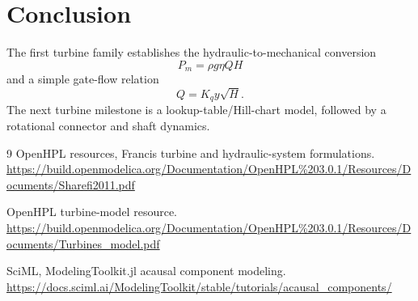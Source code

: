 \documentclass[11pt,a4paper]{article}
\begin{document}
\section*{Conclusion}
The first turbine family establishes the hydraulic-to-mechanical conversion
\[
\boxed{P_m=\rho g\eta QH}
\]
and a simple gate-flow relation
\[
\boxed{Q=K_qy\sqrt{H}}.
\]
The next turbine milestone is a lookup-table/Hill-chart model, followed by a rotational connector and shaft dynamics.

\begin{thebibliography}{9}
OpenHPL resources, Francis turbine and hydraulic-system formulations.
\url{https://build.openmodelica.org/Documentation/OpenHPL%203.0.1/Resources/Documents/Sharefi2011.pdf}

OpenHPL turbine-model resource.
\url{https://build.openmodelica.org/Documentation/OpenHPL%203.0.1/Resources/Documents/Turbines_model.pdf}

SciML, ModelingToolkit.jl acausal component modeling.
\url{https://docs.sciml.ai/ModelingToolkit/stable/tutorials/acausal_components/}
\end{thebibliography}
\end{document}
